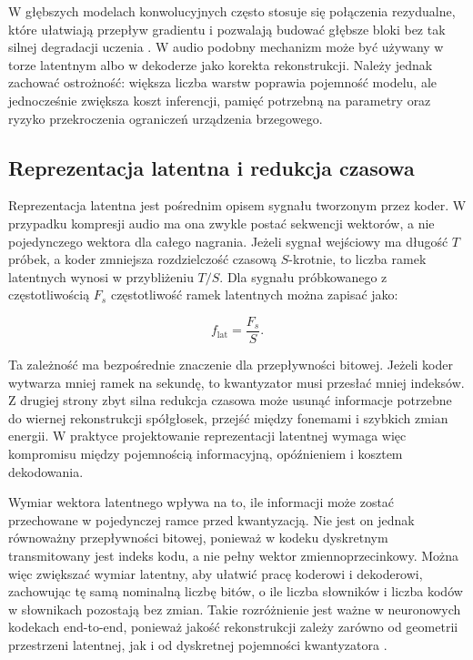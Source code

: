 W głębszych modelach konwolucyjnych często stosuje się połączenia rezydualne, które ułatwiają przepływ gradientu i pozwalają budować głębsze bloki bez tak silnej degradacji uczenia \cite{He2016DeepResidualLearning}. W audio podobny mechanizm może być używany w torze latentnym albo w dekoderze jako korekta rekonstrukcji. Należy jednak zachować ostrożność: większa liczba warstw poprawia pojemność modelu, ale jednocześnie zwiększa koszt inferencji, pamięć potrzebną na parametry oraz ryzyko przekroczenia ograniczeń urządzenia brzegowego.

\subsection{Reprezentacja latentna i redukcja czasowa}
\label{subsec:reprezentacja-latentna-redukcja-czasowa}

Reprezentacja latentna jest pośrednim opisem sygnału tworzonym przez koder. W przypadku kompresji audio ma ona zwykle postać sekwencji wektorów, a nie pojedynczego wektora dla całego nagrania. Jeżeli sygnał wejściowy ma długość \(T\) próbek, a koder zmniejsza rozdzielczość czasową \(S\)-krotnie, to liczba ramek latentnych wynosi w przybliżeniu \(T/S\). Dla sygnału próbkowanego z częstotliwością \(F_s\) częstotliwość ramek latentnych można zapisać jako:

\begin{equation}
    f_{\mathrm{lat}} = \frac{F_s}{S}.
\end{equation}

Ta zależność ma bezpośrednie znaczenie dla przepływności bitowej. Jeżeli koder wytwarza mniej ramek na sekundę, to kwantyzator musi przesłać mniej indeksów. Z drugiej strony zbyt silna redukcja czasowa może usunąć informacje potrzebne do wiernej rekonstrukcji spółgłosek, przejść między fonemami i szybkich zmian energii. W praktyce projektowanie reprezentacji latentnej wymaga więc kompromisu między pojemnością informacyjną, opóźnieniem i kosztem dekodowania.

Wymiar wektora latentnego wpływa na to, ile informacji może zostać przechowane w pojedynczej ramce przed kwantyzacją. Nie jest on jednak równoważny przepływności bitowej, ponieważ w kodeku dyskretnym transmitowany jest indeks kodu, a nie pełny wektor zmiennoprzecinkowy. Można więc zwiększać wymiar latentny, aby ułatwić pracę koderowi i dekoderowi, zachowując tę samą nominalną liczbę bitów, o ile liczba słowników i liczba kodów w słownikach pozostają bez zmian. Takie rozróżnienie jest ważne w neuronowych kodekach end-to-end, ponieważ jakość rekonstrukcji zależy zarówno od geometrii przestrzeni latentnej, jak i od dyskretnej pojemności kwantyzatora \cite{Zeghidour2021SoundStream,Defossez2022Encodec}.

